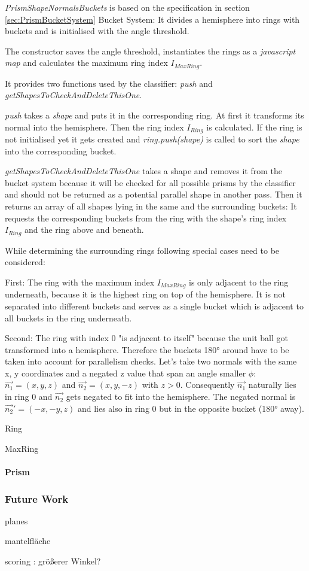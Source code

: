 \documentclass[../ClassicThesis.tex]{subfiles}
\begin{document}
\emph{PrismShapeNormalsBuckets} is based on the specification in section \ref{sec:PrismBucketSystem} Bucket System: It divides a hemisphere into rings with buckets and is initialised with the angle threshold.

The constructor saves the angle threshold, instantiates the rings as a \emph{javascript map} and calculates the maximum ring index $I_{MaxRing}$.

It provides two functions used by the classifier: \emph{push} and \emph{getShapesToCheckAndDeleteThisOne}.

\emph{push} takes a \emph{shape} and puts it in the corresponding ring. At first it transforms its normal into the hemisphere. Then the ring index $ I_{Ring} $ is calculated. If the ring is not initialised yet it gets created and \emph{ring.push(shape)} is called to sort the \emph{shape} into the corresponding bucket.

\emph{getShapesToCheckAndDeleteThisOne} takes a shape and removes it from the bucket system because it will be checked for all possible prisms by the classifier and should not be returned as a potential parallel shape in another pass. Then it returns an array of all shapes lying in the same and the surrounding buckets: It requests the corresponding buckets from the ring with the shape's ring index $ I_{Ring} $ and the ring above and beneath. 

While determining the surrounding rings following special cases need to be considered:

First: The ring with the maximum index $I_{MaxRing}$ is only adjacent to the ring underneath, because it is the highest ring on top of the hemisphere. It is not separated into different buckets and serves as a single bucket which is adjacent to all buckets in the ring underneath.

Second: The ring with index 0 "is adjacent to itself" because the unit ball got transformed into a hemisphere. Therefore the buckets 180° around have to be taken into account for parallelism checks. Let's take two normals with the same x, y coordinates and a negated z value that span an angle smaller $ \phi $: $\vec{n_{1}} = (x, y, z)$ and $\vec{n_{2}} = (x, y, -z)$ with $z > 0$. Consequently $\vec{n_{1}}$ naturally lies in ring 0 and $\vec{n_{2}}$ gets negated to fit into the hemisphere. The negated normal is $\vec{n_{2}}' = (-x, -y, z) $ and lies also in ring 0 but in the opposite bucket (180° away).  


Ring

MaxRing

\paragraph{Prism}

\subsubsection{Future Work}
\label{sec:PrismFutureWork}

planes

mantelfläche

scoring : größerer Winkel?
\end{document}
